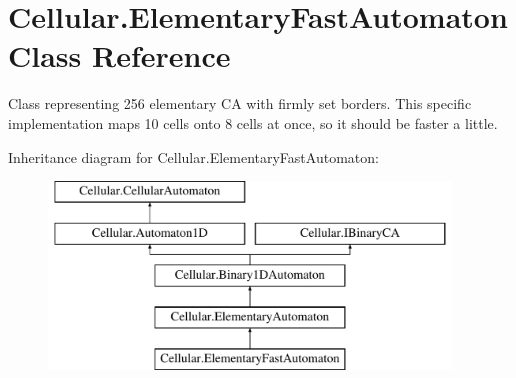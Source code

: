 \hypertarget{class_cellular_1_1_elementary_fast_automaton}{}\section{Cellular.\+Elementary\+Fast\+Automaton Class Reference}
\label{class_cellular_1_1_elementary_fast_automaton}


Class representing 256 elementary C\+A with firmly set borders. This specific implementation maps 10 cells onto 8 cells at once, so it should be faster a little.  


Inheritance diagram for Cellular.\+Elementary\+Fast\+Automaton\+:\begin{figure}[H]
\begin{center}
\leavevmode
\includegraphics[height=5.000000cm]{class_cellular_1_1_elementary_fast_automaton}
\end{center}
\end{figure}
